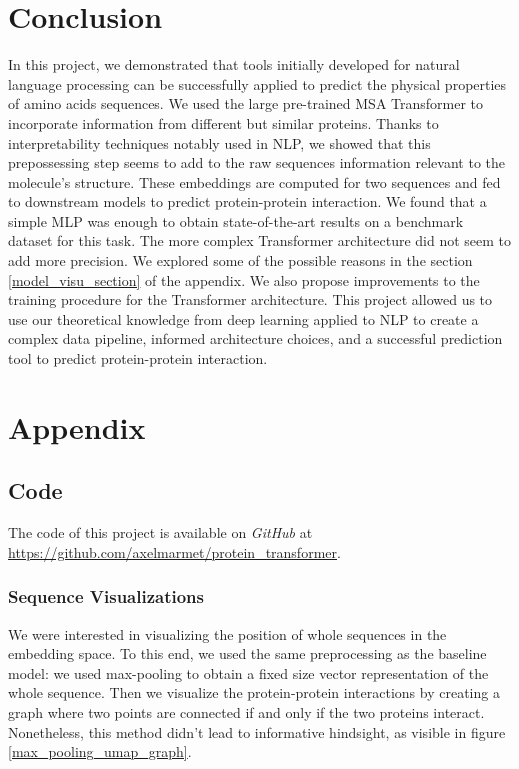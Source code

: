 \documentclass[11pt,a4paper]{article}
\begin{document}
\section{Conclusion}
In this project, we demonstrated that tools initially developed for natural language processing can be successfully applied to predict the physical properties of amino acids sequences. We used the large pre-trained MSA Transformer to incorporate information from different but similar proteins. Thanks to interpretability techniques notably used in NLP, we showed that this prepossessing step seems to add to the raw sequences information relevant to the molecule's structure. These embeddings are computed for two sequences and fed to downstream models to predict protein-protein interaction. We found that a simple MLP was enough to obtain state-of-the-art results on a benchmark dataset for this task. The more complex Transformer architecture did not seem to add more precision. We explored some of the possible reasons in the section \ref{model_visu_section} of the appendix. 
We also propose improvements to the training procedure for the Transformer architecture.
This project allowed us to use our theoretical knowledge from deep learning applied to NLP to create a complex data pipeline, informed architecture choices, and a successful prediction tool to predict protein-protein interaction.

\vspace*{6cm}

\pagebreak
\section{Appendix}

\subsection{Code}

The code of this project is available on \emph{GitHub} at \url{https://github.com/axelmarmet/protein_transformer}.


\subsubsection{Sequence Visualizations} \label{full_seq_visu_section}

We were interested in visualizing the position of whole sequences in the embedding space.
To this end, we used the same preprocessing as the baseline model: we used max-pooling to obtain a fixed size vector representation of the whole sequence. Then we visualize the protein-protein interactions by creating a graph where two points are connected if and only if the two proteins interact. Nonetheless, this method didn't lead to informative hindsight, as visible in figure \ref{max_pooling_umap_graph}.
\end{document}

